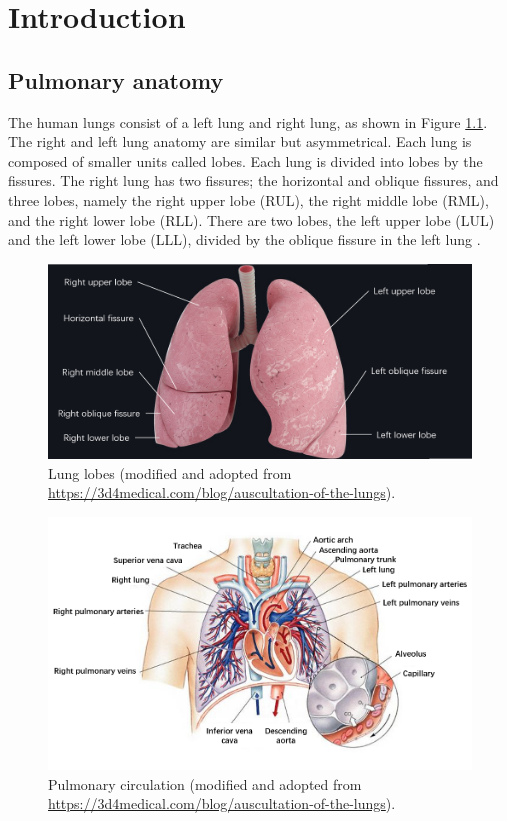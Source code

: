 \graphicspath{{Introduction/figures/}}
\chapter{Introduction}\label{ch:intro}

\ThumbIndexShow

\newcommand{\tb}{\textit{{\textbf{}}}}



\section{Pulmonary anatomy}

The human lungs consist of a left lung and right lung, as shown in Figure \ref{fig:lobes}. The right and left lung anatomy are similar but asymmetrical. Each lung is composed of smaller units called lobes. Each lung is divided into lobes by the fissures. The right lung has two fissures; the horizontal and oblique fissures, and three lobes, namely the right upper lobe (RUL), the right middle lobe (RML), and the right lower lobe (RLL). There are two lobes, the left upper lobe (LUL) and the left lower lobe (LLL), divided by the oblique fissure in the left lung \cite{aung2019overview}.



\begin{figure}
    \centering
    \includegraphics[width=0.7\linewidth]{Introduction/figures/lobes.png}
    \caption{Lung lobes (modified and adopted from \url{https://3d4medical.com/blog/auscultation-of-the-lungs}).}
    \label{fig:lobes}
\end{figure}


\begin{figure}
    \centering
    \includegraphics[width=0.7\linewidth]{Introduction/figures/lung.png}
    \caption{Pulmonary circulation (modified and adopted from \url{https://3d4medical.com/blog/auscultation-of-the-lungs}).}
    \label{fig:lung}
\end{figure}

